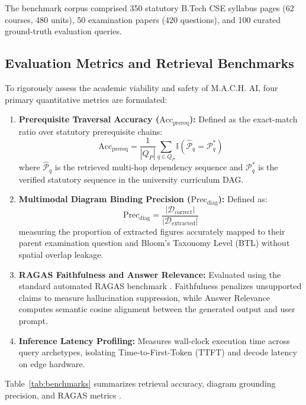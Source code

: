 \documentclass[conference]{IEEEtran}
\begin{document}
The benchmark corpus comprised 350 statutory B.Tech CSE syllabus pages (62 courses, 480 units), 50 examination papers (420 questions), and 100 curated ground-truth evaluation queries.

\subsection{Evaluation Metrics and Retrieval Benchmarks}
To rigorously assess the academic viability and safety of M.A.C.H. AI, four primary quantitative metrics are formulated:
\begin{enumerate}
    \item \textbf{Prerequisite Traversal Accuracy ($\text{Acc}_{\text{prereq}}$):} Defined as the exact-match ratio over statutory prerequisite chains:
    \begin{equation}
        \text{Acc}_{\text{prereq}} = \frac{1}{|Q_P|} \sum_{q \in Q_P} \mathbb{I}(\hat{\mathcal{P}}_q = \mathcal{P}_q^*)
    \end{equation}
    where $\hat{\mathcal{P}}_q$ is the retrieved multi-hop dependency sequence and $\mathcal{P}_q^*$ is the verified statutory sequence in the university curriculum DAG.
    \item \textbf{Multimodal Diagram Binding Precision ($\text{Prec}_{\text{diag}}$):} Defined as:
    \begin{equation}
        \text{Prec}_{\text{diag}} = \frac{|\mathcal{D}_{\text{correct}}|}{|\mathcal{D}_{\text{extracted}}|}
    \end{equation}
    measuring the proportion of extracted figures accurately mapped to their parent examination question and Bloom's Taxonomy Level (BTL) without spatial overlap leakage.
    \item \textbf{RAGAS Faithfulness and Answer Relevance:} Evaluated using the standard automated RAGAS benchmark \cite{es2024ragas}. Faithfulness penalizes unsupported claims to measure hallucination suppression, while Answer Relevance computes semantic cosine alignment between the generated output and user prompt.
    \item \textbf{Inference Latency Profiling:} Measures wall-clock execution time across query archetypes, isolating Time-to-First-Token (TTFT) and decode latency on edge hardware.
\end{enumerate}

Table~\ref{tab:benchmarks} summarizes retrieval accuracy, diagram grounding precision, and RAGAS metrics \cite{es2024ragas}.
\end{document}
